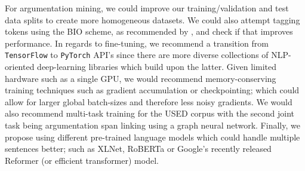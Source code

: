  For argumentation mining, we could improve our training/validation and test data splits to create more homogeneous datasets. We could also attempt tagging tokens using the BIO scheme, as recommended by \citet{eger2017neural}, and check if that improves performance. In regards to fine-tuning, we recommend a transition from \texttt{TensorFlow} to \texttt{PyTorch} API's since there are more diverse collections of NLP-oriented deep-learning libraries which build upon the latter. Given limited hardware such as a single GPU, we would recommend memory-conserving training techniques such as gradient accumulation or checkpointing; which could allow for larger global batch-sizes and therefore less noisy gradients. We would also recommend multi-task training for the USED corpus with the second joint task being argumentation span linking using a graph neural network. Finally, we propose using different pre-trained language models which could handle multiple sentences better; such as XLNet, RoBERTa or Google's recently released Reformer (or efficient transformer) model.